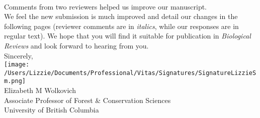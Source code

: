 \documentclass[11pt,a4paper]{letter}
\begin{document}
\begin{letter}{}
\vspace{1.5ex}\\
Comments from two reviewers helped us improve our manuscript. 
\vspace{1.5ex}\\
We feel the new submission is much improved and detail our changes in the following pages (reviewer comments are in \emph{italics}, while our responses are in regular text). We hope that you will find it suitable for publication in \emph{Biological Reviews} and look forward to hearing from you.
\vspace{1.5ex}\\
Sincerely,\\

\texttt{[image: /Users/Lizzie/Documents/Professional/Vitas/Signatures/SignatureLizzieSm.png]} \\

Elizabeth M Wolkovich\\
Associate Professor of Forest \& Conservation Sciences\\ 
University of British Columbia
\end{letter}
\end{document}
